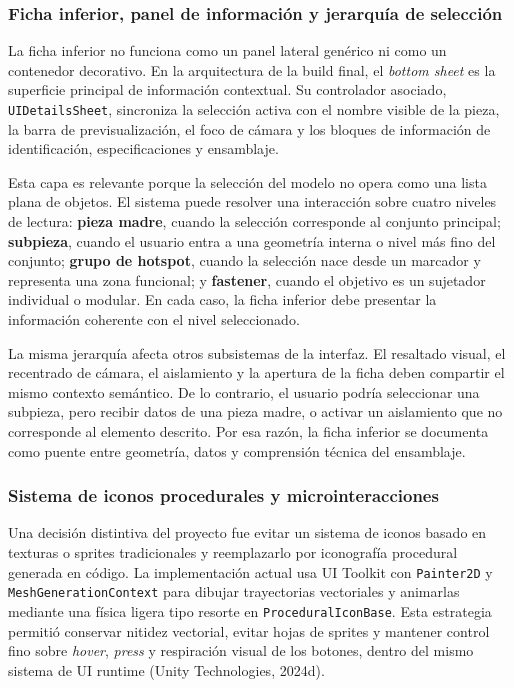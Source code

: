 \subsubsection{Ficha inferior, panel de información y jerarquía de selección}

La ficha inferior no funciona como un panel lateral genérico ni como un contenedor decorativo. En la arquitectura de la build final, el \textit{bottom sheet} es la superficie principal de información contextual. Su controlador asociado, \texttt{UIDetailsSheet}, sincroniza la selección activa con el nombre visible de la pieza, la barra de previsualización, el foco de cámara y los bloques de información de identificación, especificaciones y ensamblaje.

Esta capa es relevante porque la selección del modelo no opera como una lista plana de objetos. El sistema puede resolver una interacción sobre cuatro niveles de lectura: \textbf{pieza madre}, cuando la selección corresponde al conjunto principal; \textbf{subpieza}, cuando el usuario entra a una geometría interna o nivel más fino del conjunto; \textbf{grupo de hotspot}, cuando la selección nace desde un marcador y representa una zona funcional; y \textbf{fastener}, cuando el objetivo es un sujetador individual o modular. En cada caso, la ficha inferior debe presentar la información coherente con el nivel seleccionado.

La misma jerarquía afecta otros subsistemas de la interfaz. El resaltado visual, el recentrado de cámara, el aislamiento y la apertura de la ficha deben compartir el mismo contexto semántico. De lo contrario, el usuario podría seleccionar una subpieza, pero recibir datos de una pieza madre, o activar un aislamiento que no corresponde al elemento descrito. Por esa razón, la ficha inferior se documenta como puente entre geometría, datos y comprensión técnica del ensamblaje.

\subsubsection{Sistema de iconos procedurales y microinteracciones}

Una decisión distintiva del proyecto fue evitar un sistema de iconos basado en texturas o sprites tradicionales y reemplazarlo por iconografía procedural generada en código. La implementación actual usa UI Toolkit con \texttt{Painter2D} y \texttt{MeshGenerationContext} para dibujar trayectorias vectoriales y animarlas mediante una física ligera tipo resorte en \texttt{ProceduralIconBase}. Esta estrategia permitió conservar nitidez vectorial, evitar hojas de sprites y mantener control fino sobre \textit{hover}, \textit{press} y respiración visual de los botones, dentro del mismo sistema de UI runtime (Unity Technologies, 2024d).

